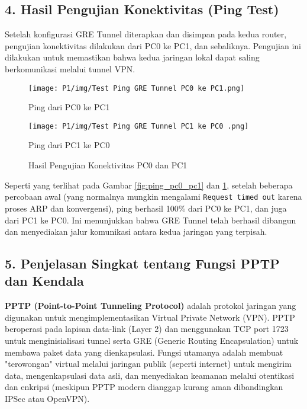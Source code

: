 \subsection*{4. Hasil Pengujian Konektivitas (Ping Test)}
Setelah konfigurasi GRE Tunnel diterapkan dan disimpan pada kedua router, pengujian konektivitas dilakukan dari PC0 ke PC1, dan sebaliknya. Pengujian ini dilakukan untuk memastikan bahwa kedua jaringan lokal dapat saling berkomunikasi melalui tunnel VPN.

\begin{figure}[h!]
    \centering
    \begin{minipage}[t]{0.48\textwidth}
        \centering
        \texttt{[image: P1/img/Test Ping GRE Tunnel PC0 ke PC1.png]} 
        \caption{Ping dari PC0 ke PC1}
        \label{fig:ping_pc0_pc1}
    \end{minipage}
    \hfill
    \begin{minipage}[t]{0.48\textwidth}
        \centering
        \texttt{[image: P1/img/Test Ping GRE Tunnel PC1 ke PC0 .png]} 
        \caption{Ping dari PC1 ke PC0}
        \label{fig:ping_pc1_pc0}
    \end{minipage}
    \caption{Hasil Pengujian Konektivitas PC0 dan PC1}
\end{figure}

Seperti yang terlihat pada Gambar \ref{fig:ping_pc0_pc1} dan \ref{fig:ping_pc1_pc0}, setelah beberapa percobaan awal (yang normalnya mungkin mengalami \texttt{Request timed out} karena proses ARP dan konvergensi), ping berhasil 100\% dari PC0 ke PC1, dan juga dari PC1 ke PC0. Ini menunjukkan bahwa GRE Tunnel telah berhasil dibangun dan menyediakan jalur komunikasi antara kedua jaringan yang terpisah.

\subsection*{5. Penjelasan Singkat tentang Fungsi PPTP dan Kendala}
\textbf{PPTP (Point-to-Point Tunneling Protocol)} adalah protokol jaringan yang digunakan untuk mengimplementasikan Virtual Private Network (VPN). PPTP beroperasi pada lapisan data-link (Layer 2) dan menggunakan TCP port 1723 untuk menginisialisasi tunnel serta GRE (Generic Routing Encapsulation) untuk membawa paket data yang dienkapsulasi. Fungsi utamanya adalah membuat "terowongan" virtual melalui jaringan publik (seperti internet) untuk mengirim data, mengenkapsulasi data asli, dan menyediakan keamanan melalui otentikasi dan enkripsi (meskipun PPTP modern dianggap kurang aman dibandingkan IPSec atau OpenVPN).

